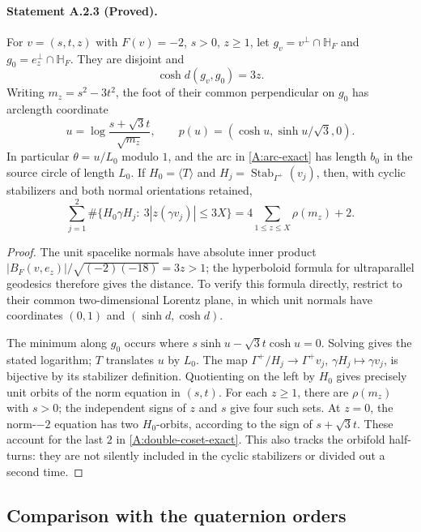 \paragraph{Statement A.2.3 (Proved).}
For $v=(s,t,z)$ with $F(v)=-2$, $s>0$, $z\geq1$, let
$g_v=v^\perp\cap\mathbb H_F$ and $g_0=e_z^\perp\cap\mathbb H_F$.
They are disjoint and
\[
 \cosh d(g_v,g_0)=3z.
\]
Writing $m_z=s^2-3t^2$, the foot of their common perpendicular on $g_0$
has arclength coordinate
\[
 u=\log\frac{s+\sqrt3t}{\sqrt{m_z}},\qquad
 p(u)=(\cosh u,\sinh u/\sqrt3,0).
\]
In particular $\theta=u/L_0$ modulo $1$, and the arc in
\eqref{A:arc-exact} has length $b_0$ in the source circle of length $L_0$.
If $H_0=\langle T\rangle$ and $H_j=\operatorname{Stab}_{\Gamma^+}(v_j)$,
then, with cyclic stabilizers and both normal orientations retained,
\begin{equation}\label{A:double-coset-exact}
 \sum_{j=1}^2
 \#\{H_0\gamma H_j:\ 3|z(\gamma v_j)|\leq3X\}
 =4\sum_{1\leq z\leq X}\rho(m_z)+2.
\end{equation}
\begin{proof}
The unit spacelike normals have absolute inner product
$|B_F(v,e_z)|/\sqrt{(-2)(-18)}=3z>1$; the hyperboloid formula for
ultraparallel geodesics therefore gives the distance. To verify this
formula directly, restrict to their common two-dimensional Lorentz
plane, in which unit normals have coordinates $(0,1)$ and
$(\sinh d,\cosh d)$.

The minimum along $g_0$ occurs where
$s\sinh u-\sqrt3t\cosh u=0$. Solving gives the stated logarithm;
$T$ translates $u$ by $L_0$. The map
$\Gamma^+/H_j\to\Gamma^+v_j$, $\gamma H_j\mapsto\gamma v_j$,
is bijective by its stabilizer definition. Quotienting on the left by
$H_0$ gives precisely unit orbits of the norm equation in $(s,t)$.
For each $z\geq1$, there are $\rho(m_z)$ with $s>0$; the independent signs
of $z$ and $s$ give four such sets. At $z=0$, the norm-$-2$ equation has
two $H_0$-orbits, according to the sign of $s+\sqrt3t$. These account for
the last $2$ in \eqref{A:double-coset-exact}. This also tracks the
orbifold half-turns: they are not silently included in the cyclic
stabilizers or divided out a second time.
\end{proof}

\subsection{Comparison with the quaternion orders}
